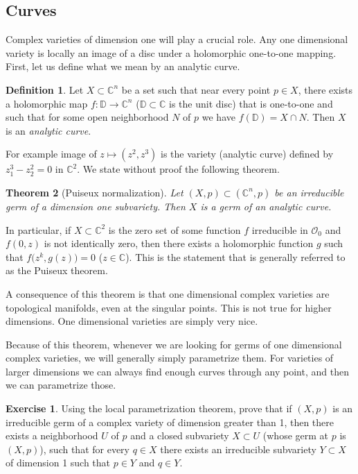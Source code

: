 \documentclass[12pt,openany]{book}
\newcommand{\C}{{\mathbb{C}}}
\newcommand{\bD}{{\mathbb{D}}}
\newcommand{\sO}{{\mathcal{O}}}
\newcommand{\myindex}[1]{#1\index{#1}}
\theoremstyle{plain}
\newtheorem{thm}{Theorem}[section]
\theoremstyle{remark}
\theoremstyle{definition}
\newtheorem{defn}[thm]{Definition}
\theoremstyle{exercise}
\newtheorem{exercise}{Exercise}[section]
\theoremstyle{example}
\begin{document}
\subsection{Curves}

Complex varieties of dimension one will play a crucial role.
Any one dimensional variety is locally an image of a disc under a
holomorphic one-to-one mapping.
First, let us define what we mean by
an analytic curve.

\begin{defn}
Let $X \subset \C^n$ be a set such that near every point $p \in X$, there
exists a holomorphic map $f \colon \bD \to \C^n$ ($\bD \subset \C$ is the
unit disc) that is one-to-one and such that for some open neighborhood
$N$ of $p$ we have $f(\bD) = X \cap N$.  Then $X$ is an
\emph{\myindex{analytic curve}}.
\end{defn}

For example image of $z \mapsto (z^2,z^3)$ is the variety (analytic curve)
defined by $z_1^3-z_2^2 = 0$ in $\C^2$.  We state without proof the
following theorem.

\begin{thm}[Puiseux normalization]
Let $(X,p) \subset (\C^n,p)$ be an irreducible germ of
a dimension one subvariety.  Then $X$ is a germ of an analytic curve.
\end{thm}

In particular, if $X \subset \C^2$ is the zero set of some function $f$
irreducible in $\sO_0$
and $f(0,z)$ is not identically zero, then there
exists a holomorphic function $g$ such that $f\bigl(z^k,g(z)\bigr) = 0$ ($z \in \C$).
This is the statement that is generally referred to as the Puiseux theorem.

A consequence of this theorem is that one dimensional complex varieties
are topological manifolds, even at the singular points.  This is not true for
higher dimensions.  One dimensional varieties are simply very nice.

Because of this theorem, whenever we are looking for germs of
one dimensional complex
varieties, we will generally simply parametrize them.  For 
varieties of larger
dimensions we can always find enough curves through any point,
and then we can parametrize those.

\begin{exercise}
Using the local parametrization theorem, prove that
if $(X,p)$ is an irreducible germ of a complex variety of dimension greater
than 1, then there exists a neighborhood $U$ of $p$ and a closed subvariety
$X \subset U$ (whose germ at $p$ is $(X,p)$), such that for every
$q \in X$ there exists an irreducible subvariety $Y \subset X$
of dimension 1 such that $p \in Y$ and $q \in Y$.
\end{exercise}
\end{document}

